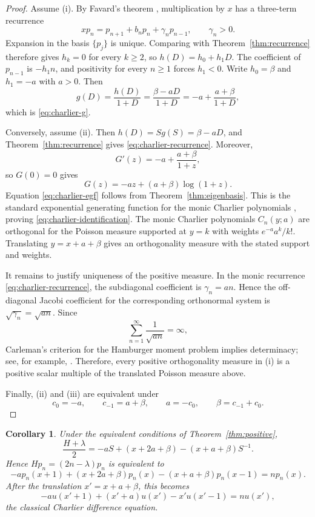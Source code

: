 \documentclass[11pt,reqno]{amsart}
\numberwithin{equation}{section}
\newtheorem{corollary}[theorem]{Corollary}
\theoremstyle{definition}
\theoremstyle{remark}
\begin{document}
\begin{proof}
Assume (i).  By Favard's theorem \cite[Chapter~I, Section~4]{Chihara1978}, multiplication by $x$ has a three-term recurrence
\[
 xp_n=p_{n+1}+b_np_n+\gamma_np_{n-1},
 \qquad \gamma_n>0.
\]
Expansion in the basis $\{p_j\}$ is unique.  Comparing with Theorem~\ref{thm:recurrence} therefore gives $h_k=0$ for every $k\ge2$, so $h(D)=h_0+h_1D$.  The coefficient of $p_{n-1}$ is $-h_1n$, and positivity for every $n\ge1$ forces $h_1<0$.  Write $h_0=\beta$ and $h_1=-a$ with $a>0$.  Then
\[
 g(D)=\frac{h(D)}{1+D}
 =\frac{\beta-aD}{1+D}
 =-a+\frac{a+\beta}{1+D},
\]
which is \eqref{eq:charlier-g}.

Conversely, assume (ii).  Then $h(D)=Sg(S)=\beta-aD$, and Theorem~\ref{thm:recurrence} gives \eqref{eq:charlier-recurrence}.  Moreover,
\[
 G'(z)=-a+\frac{a+\beta}{1+z},
\]
so $G(0)=0$ gives
\[
 G(z)=-az+(a+\beta)\log(1+z).
\]
Equation \eqref{eq:charlier-egf} follows from Theorem~\ref{thm:eigenbasis}.  This is the standard exponential generating function for the monic Charlier polynomials \cite{KoekoekLeskySwarttouw2010,Meixner1934}, proving \eqref{eq:charlier-identification}.  The monic Charlier polynomials $C_n(y;a)$ are orthogonal for the Poisson measure supported at $y=k$ with weights $e^{-a}a^k/k!$.  Translating $y=x+a+\beta$ gives an orthogonality measure with the stated support and weights.

It remains to justify uniqueness of the positive measure.  In the monic recurrence \eqref{eq:charlier-recurrence}, the subdiagonal coefficient is $\gamma_n=an$.  Hence the off-diagonal Jacobi coefficient for the corresponding orthonormal system is $\sqrt{\gamma_n}=\sqrt{an}$.  Since
\[
 \sum_{n=1}^{\infty}\frac{1}{\sqrt{an}}=\infty,
\]
Carleman's criterion for the Hamburger moment problem implies determinacy; see, for example, \cite{Chihara1978}.  Therefore, every positive orthogonality measure in (i) is a positive scalar multiple of the translated Poisson measure above.

Finally, (ii) and (iii) are equivalent under
\[
 c_0=-a,
 \qquad c_{-1}=a+\beta,
 \qquad
 a=-c_0,
 \qquad \beta=c_{-1}+c_0.
\]
\end{proof}

\begin{corollary}\label{cor:charlier-equation}
Under the equivalent conditions of Theorem~\ref{thm:positive},
\[
 \frac{H+\lambda}{2}
 =-aS+(x+2a+\beta)-(x+a+\beta)S^{-1}.
\]
Hence $Hp_n=(2n-\lambda)p_n$ is equivalent to
\begin{equation}\label{eq:translated-charlier-equation}
 -ap_n(x+1)+(x+2a+\beta)p_n(x)
 -(x+a+\beta)p_n(x-1)=np_n(x).
\end{equation}
After the translation $x'=x+a+\beta$, this becomes
\[
 -au(x'+1)+(x'+a)u(x')-x'u(x'-1)=nu(x'),
\]
the classical Charlier difference equation.
\end{corollary}
\end{document}
